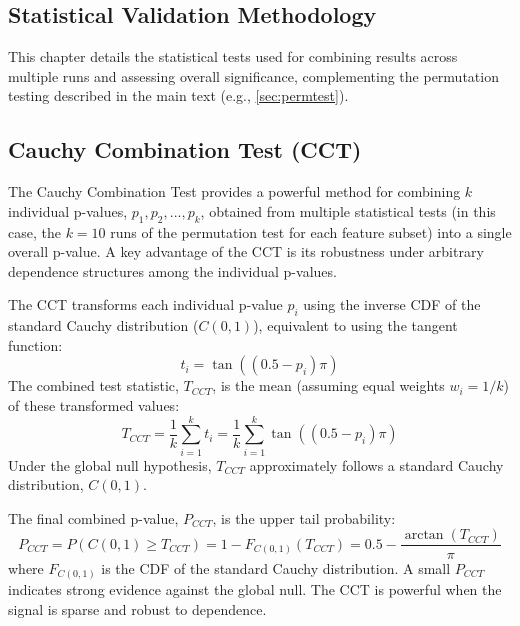 \begin{appendices}
  \chapter{Statistical Validation Methodology} %
  \label{app:cct} %

  This chapter details the statistical tests used for combining results across multiple runs and assessing overall significance, complementing the permutation testing described in the main text (e.g., \autoref{sec:permtest}).

  \section{Cauchy Combination Test (CCT)}
  \label{sec:cct_methodology} %

  The Cauchy Combination Test \autocite{liu2020cauchy} provides a powerful method for combining $k$ individual p-values, $p_1, p_2, ..., p_k$, obtained from multiple statistical tests (in this case, the $k=10$ runs of the permutation test for each feature subset) into a single overall p-value. A key advantage of the CCT is its robustness under arbitrary dependence structures among the individual p-values.

  The CCT transforms each individual p-value $p_i$ using the inverse CDF of the standard Cauchy distribution ($C(0,1)$), equivalent to using the tangent function:
  \begin{equation}
    t_i = \tan\left( (0.5 - p_i) \pi \right)
    \label{eq:cct_transform} %
  \end{equation}
  The combined test statistic, $T_{CCT}$, is the mean (assuming equal weights $w_i=1/k$) of these transformed values:
  \begin{equation}
    T_{CCT} = \frac{1}{k} \sum_{i=1}^k t_i = \frac{1}{k} \sum_{i=1}^k \tan\left( (0.5 - p_i) \pi \right)
    \label{eq:cct_statistic} %
  \end{equation}
  Under the global null hypothesis, $T_{CCT}$ approximately follows a standard Cauchy distribution, $C(0,1)$.

  The final combined p-value, $P_{CCT}$, is the upper tail probability:
  \begin{equation}
    P_{CCT} = P(C(0,1) \ge T_{CCT}) = 1 - F_{C(0,1)}(T_{CCT}) = 0.5 - \frac{\arctan(T_{CCT})}{\pi}
    \label{eq:cct_pvalue} %
  \end{equation}
  where $F_{C(0,1)}$ is the CDF of the standard Cauchy distribution. A small $P_{CCT}$ indicates strong evidence against the global null. The CCT is powerful when the signal is sparse and robust to dependence.


\end{appendices}
